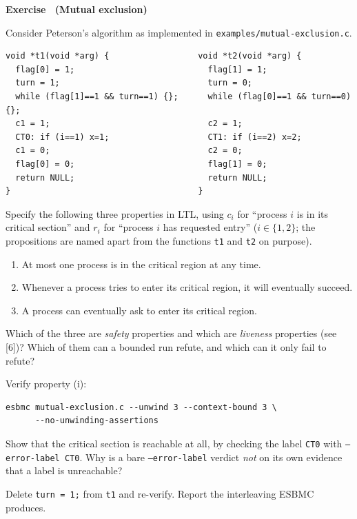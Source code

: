 \documentclass[11pt,a4paper]{article}
\newcommand{\esbmc}{ESBMC}
\newcommand{\flag}[1]{\texttt{\small #1}}
\newcommand{\file}[1]{\texttt{\small #1}}
\newcounter{exc}
\renewcommand{\theexc}{\arabic{exc}}
\newenvironment{exercise}[2][]
  {\stepcounter{exc}\ifx\relax#1\relax\else\excref{#1}\fi%
   \medskip\noindent\textbf{Exercise \theexc\ (#2)}\par\nopagebreak\smallskip}
  {\par\medskip}
\begin{document}
\begin{exercise}{Mutual exclusion}
Consider Peterson's algorithm as implemented in
\file{examples/mutual-exclusion.c}.

\begin{lstlisting}
void *t1(void *arg) {                  void *t2(void *arg) {
  flag[0] = 1;                           flag[1] = 1;
  turn = 1;                              turn = 0;
  while (flag[1]==1 && turn==1) {};      while (flag[0]==1 && turn==0) {};
  c1 = 1;                                c2 = 1;
  CT0: if (i==1) x=1;                    CT1: if (i==2) x=2;
  c1 = 0;                                c2 = 0;
  flag[0] = 0;                           flag[1] = 0;
  return NULL;                           return NULL;
}                                      }
\end{lstlisting}

\begin{parts}
  \item Specify the following three properties in LTL, using $c_i$ for
        ``process $i$ is in its critical section'' and $r_i$ for ``process $i$
        has requested entry'' ($i \in \{1,2\}$; the propositions are named
        apart from the functions \texttt{t1} and \texttt{t2} on purpose).
        \begin{enumerate}[label=\roman*.,leftmargin=2.2em,topsep=2pt]
          \item At most one process is in the critical region at any time.
          \item Whenever a process tries to enter its critical region, it will
                eventually succeed.
          \item A process can eventually ask to enter its critical region.
        \end{enumerate}
  \item Which of the three are \emph{safety} properties and which are
        \emph{liveness} properties (see [6])? Which of them can a
        bounded run refute, and which can it only fail to refute?
  \item Verify property (i):
\begin{lstlisting}[style=sh]
esbmc mutual-exclusion.c --unwind 3 --context-bound 3 \
      --no-unwinding-assertions
\end{lstlisting}
  \item Show that the critical section is reachable at all, by checking the
        label \texttt{CT0} with \flag{--error-label CT0}. Why is a bare
        \flag{--error-label} verdict \emph{not} on its own evidence that a label
        is unreachable?
  \item Delete \texttt{turn = 1;} from \texttt{t1} and re-verify. Report the
        interleaving \esbmc{} produces.
\end{parts}
\end{exercise}
\end{document}
